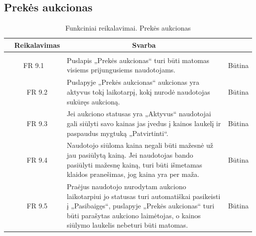 \documentclass{VUMIFPSkursinis}
\begin{document}
\subsection{Prekės aukcionas}
\begin{table}[H]
	\caption{Funkciniai reikalavimai. Prekės aukcionas}
	\begin{tabular}{|p{1cm}|p{1cm}|p{}|p{}|}
		\hline 
		\rowcolor{gray!50}
		\multicolumn{2}{|c|}{{\bfseries Kodas}}&
		\multicolumn{1}{c|}{{\bfseries Reikalavimas}}&
		\multicolumn{1}{c|}{{\bfseries Svarba}}\\
		\hline
		\rowcolor{lightgray}
		\multicolumn{4}{|c|}{Prekės aukcionas}\\				
		\hline
		\multicolumn{2}{|c|}{FR 9.1}&
		{Puslapis „Prekės aukcionas“ turi būti matomas visiems prijungusiems naudotojams.
		}&		
		\multicolumn{1}{c|}{Būtina}\\
		\hline
		\multicolumn{1}{|c}{}&
		\multicolumn{1}{c|}{FR 9.2}&
		{Puslapyje „Prekės aukcionas“ aukcionas yra aktyvus tokį laikotarpį, kokį nurodė naudotojas sukūręs aukcioną.
		}&		
		\multicolumn{1}{c|}{Būtina}\\
		\hline	
		\multicolumn{1}{|c}{}&
		\multicolumn{1}{c|}{FR 9.3}&
		{Jei aukciono statusas yra „Aktyvus“ naudotojai gali siūlyti savo kainas jas įvedus į kainos laukelį ir paspaudus mygtuką „Patvirtinti“.
		}&
		\multicolumn{1}{c|}{Būtina}\\									
		\hline
		\multicolumn{1}{|c}{}&
		\multicolumn{1}{c|}{FR 9.4}&
		{Naudotojo siūloma kaina negali būti mažesnė už jau pasiūlytą kainą. Jei naudotojas bando pasiūlyti mažesnę kainą, turi būti išmetamas klaidos pranešimas, jog kaina yra per maža.
		}&
		\multicolumn{1}{c|}{Būtina}\\									
		\hline
		\multicolumn{1}{|c}{}&
		\multicolumn{1}{c|}{FR 9.5}&
		{Praėjus naudotojo nurodytam aukciono laikotarpiui jo statusas turi automatiškai pasikeisti į „Pasibaigęs“, puslapyje „Prekės aukcionas“ turi būti parašytas aukciono laimėtojas, o kainos siūlymo laukelis nebeturi būti matomas.
		}&
		\multicolumn{1}{c|}{Būtina}\\									
		\hline
	\end{tabular}		
\end{table}
\end{document}
